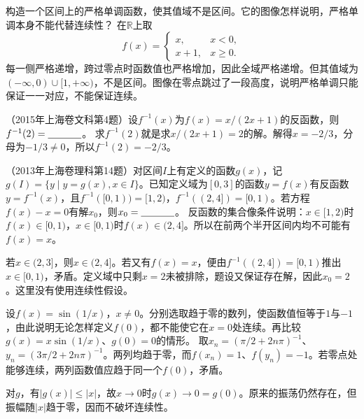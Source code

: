 构造一个区间上的严格单调函数，使其值域不是区间。它的图像怎样说明，严格单调本身不能代替连续性？
\solutionanswer
在\(\mathbb R\)上取
\[
f(x)=\begin{cases}x,&x<0,\\x+1,&x\ge0.\end{cases}
\]
每一侧严格递增，跨过零点时函数值也严格增加，因此全域严格递增。但其值域为\(( -\infty,0)\cup[1,+\infty)\)，不是区间。图像在零点跳过了一段高度，说明严格单调只能保证一一对应，不能保证连续。


（2015年上海卷文科第4题）设\(f^{-1}(x)\)为\(f(x)=x/(2x+1)\)的反函数，则\(f^{-1}(2)=\underline{\hspace{1.2cm}}\)。
\solutionanswer
求\(f^{-1}(2)\)就是求\(x/(2x+1)=2\)的解。解得\(x=-2/3\)，分母为\(-1/3\ne0\)，所以\(\boxed{f^{-1}(2)=-2/3}\)。


（2013年上海卷理科第14题）对区间\(I\)上有定义的函数\(g(x)\)，记\(g(I)=\{y\mid y=g(x),x\in I\}\)。已知定义域为\([0,3]\)的函数\(y=f(x)\)有反函数\(y=f^{-1}(x)\)，且\(f^{-1}([0,1))=[1,2)\)，\(f^{-1}((2,4])=[0,1)\)。若方程\(f(x)-x=0\)有解\(x_0\)，则\(x_0=\underline{\hspace{1.2cm}}\)。
\solutionanswer
反函数的集合像条件说明：\(x\in[1,2)\)时\(f(x)\in[0,1)\)，\(x\in[0,1)\)时\(f(x)\in(2,4]\)。所以在前两个半开区间内均不可能有\(f(x)=x\)。

若\(x\in(2,3]\)，则\(x\in(2,4]\)。若又有\(f(x)=x\)，便由\(f^{-1}((2,4])=[0,1)\)推出\(x\in[0,1)\)，矛盾。定义域中只剩\(x=2\)未被排除，题设又保证存在解，因此\(\boxed{x_0=2}\)。这里没有使用连续性假设。


设\(f(x)=\sin(1/x)\)，\(x\ne0\)。分别选取趋于零的数列，使函数值恒等于\(1\)与\(-1\)，由此说明无论怎样定义\(f(0)\)，都不能使它在\(x=0\)处连续。再比较\(g(x)=x\sin(1/x)\)、\(g(0)=0\)的情形。
\solutionanswer
取\(x_n=(\pi/2+2n\pi)^{-1}\)、\(y_n=(3\pi/2+2n\pi)^{-1}\)。两列均趋于零，而\(f(x_n)=1\)、\(f(y_n)=-1\)。若零点处能够连续，两列函数值应趋于同一个\(f(0)\)，矛盾。

对\(g\)，有\(|g(x)|\le|x|\)，故\(x\to0\)时\(g(x)\to0=g(0)\)。原来的振荡仍然存在，但振幅随\(|x|\)趋于零，因而不破坏连续性。


